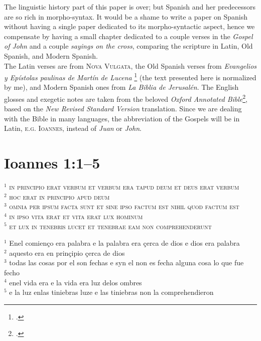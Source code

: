 \documentclass{report}[12pt]
\begin{document}
The linguistic history part of this paper is over; but Spanish and her predecessors are so rich in morpho-syntax. It would be a shame to write a paper on Spanish without having a single paper dedicated to its morpho-syntactic aspect, hence we compensate by having a small chapter dedicated to a couple verses in the \emph{Gospel of John} and a couple \emph{sayings on the cross}, comparing the scripture in Latin, Old Spanish, and Modern Spanish. \\
The Latin verses are from \textsc{Nova Vulgata}, the Old Spanish verses from \emph{Evangelios y Epístolas paulinas de Mart\'{i}n de Lucena} \footcite{osp_nt} (the text presented here is normalized by me), and Modern Spanish ones from \emph{La Biblia de Jerusal\'{e}n}. The English glosses and exegetic notes are taken from the beloved \emph{Oxford Annotated Bible}\footcite{oab}, based on the \emph{New Revised Standard Version} translation. Since we are dealing with the Bible in many languages, the abbreviation of the Gospels will be in Latin, \textsc{e.g.} \textsc{Ioannes}, instead of \emph{Juan} or \emph{John}.

\section{Ioannes 1:1--5}

\begin{tcolorbox}[title=\textsc{Nova Vulgata}]
  \textsc{$^1$ in principio erat verbum et verbum era tapud deum et deus erat verbum} \\
  \textsc{$^2$ hoc erat in principio apud deum} \\
  \textsc{$^3$ omnia per ipsum facta sunt et sine ipso factum est nihil quod factum est} \\
  \textsc{$^4$ in ipso vita erat et vita erat lux hominum} \\
  \textsc{$^5$ et lux in tenebris lucet et tenebrae eam non comprehenderunt} \\
\end{tcolorbox}

\begin{tcolorbox}[title=Evangelios y Epístolas paulinas de Mart\'{i}n de Lucena]
  $^1$ Enel comien\c{c}o era palabra e la palabra era \c{c}erca de dios e dios era palabra \\
  $^2$ aquesto era en prin\c{c}ipio \c{c}erca de dios \\
  $^3$ todas las cosas por el son fechas e syn el non es fecha alguna cosa lo que fue fecho \\
  $^4$ enel vida era e la vida era luz delos ombres \\
  $^5$ e la luz enlas tiniebras luze e las tiniebras non la comprehendieron \\
\end{tcolorbox}
\end{document}
